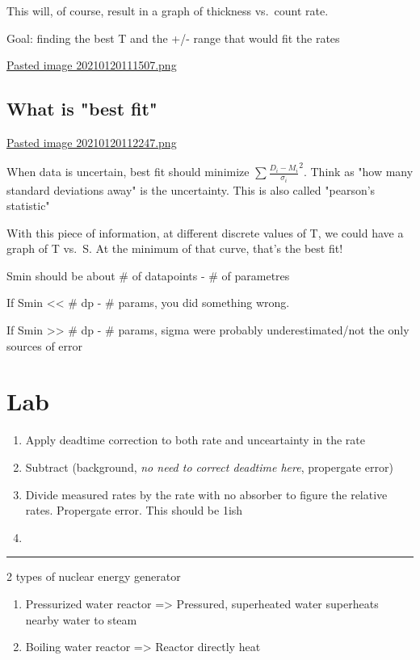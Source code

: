 \documentclass[letterpaper]{article}
\begin{document}
This will, of course, result in a graph of thickness vs. count rate.

Goal: finding the best T and the +/- range that would fit the rates

\href{Pasted image 20210120111507.png.org}{Pasted image
20210120111507.png}

\subsection{What is "best fit"}
\label{sec:org5d56a5d}
\href{Pasted image 20210120112247.png.org}{Pasted image
20210120112247.png}

When data is uncertain, best fit should minimize
\(\sum \frac{D_i-M_i}{\sigma_i}^2\). Think as "how many standard
deviations away" is the uncertainty. This is also called "pearson's
statistic"

With this piece of information, at different discrete values of T, we
could have a graph of T vs. S. At the minimum of that curve, that's the
best fit!

Smin should be about \# of datapoints - \# of parametres

If Smin << \# dp - \# params, you did something wrong.

If Smin >> \# dp - \# params, sigma were probably underestimated/not the
only sources of error

\section{Lab}
\label{sec:org00b278e}
\begin{enumerate}
\item Apply deadtime correction to both rate and unceartainty in the rate
\item Subtract (background, \emph{no need to correct deadtime here}, propergate
error)
\item Divide measured rates by the rate with no absorber to figure the
relative rates. Propergate error. This should be 1ish
\item 
\end{enumerate}

\noindent\rule{\textwidth}{0.5pt}

2 types of nuclear energy generator

\begin{enumerate}
\item Pressurized water reactor => Pressured, superheated water superheats
nearby water to steam
\item Boiling water reactor => Reactor directly heat
\end{enumerate}
\end{document}
